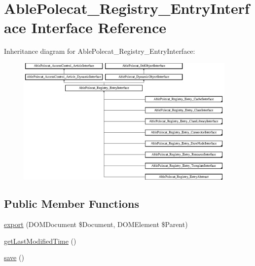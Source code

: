 \hypertarget{interface_able_polecat___registry___entry_interface}{}\section{Able\+Polecat\+\_\+\+Registry\+\_\+\+Entry\+Interface Interface Reference}
\label{interface_able_polecat___registry___entry_interface}
Inheritance diagram for Able\+Polecat\+\_\+\+Registry\+\_\+\+Entry\+Interface\+:\begin{figure}[H]
\begin{center}
\leavevmode
\includegraphics[height=6.260162cm]{interface_able_polecat___registry___entry_interface}
\end{center}
\end{figure}
\subsection*{Public Member Functions}
\begin{DoxyCompactItemize}
\item 
\hyperlink{interface_able_polecat___registry___entry_interface_a0a05b2e4b3a44390eeb042064e427b1a}{export} (D\+O\+M\+Document \$Document, D\+O\+M\+Element \$Parent)
\item 
\hyperlink{interface_able_polecat___registry___entry_interface_ada825a3515aa1569a1a2893c47a643b9}{get\+Last\+Modified\+Time} ()
\item 
\hyperlink{interface_able_polecat___registry___entry_interface_afc8a3c62679cf00ade9f15fb2a6d6132}{save} ()
\end{DoxyCompactItemize}
